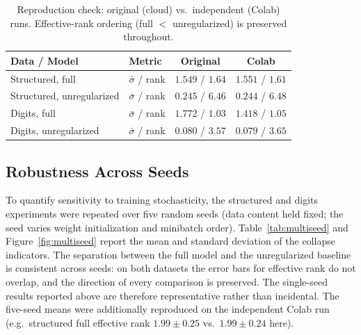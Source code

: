 \begin{table}[htbp]
    \centering
    \caption{Reproduction check: original (cloud) vs.\ independent (Colab)
    runs. Effective-rank ordering (full $<$ unregularized) is preserved
    throughout.}
    \label{tab:repro}
    \begin{tabular}{llcc}
        \toprule
        \textbf{Data / Model} & \textbf{Metric} & \textbf{Original} & \textbf{Colab} \\
        \midrule
        Structured, full          & $\bar\sigma$ / rank & $1.549$ / $1.64$ & $1.551$ / $1.61$ \\
        Structured, unregularized & $\bar\sigma$ / rank & $0.245$ / $6.46$ & $0.244$ / $6.48$ \\
        Digits, full              & $\bar\sigma$ / rank & $1.772$ / $1.03$ & $1.418$ / $1.05$ \\
        Digits, unregularized     & $\bar\sigma$ / rank & $0.080$ / $3.57$ & $0.079$ / $3.65$ \\
        \bottomrule
    \end{tabular}
\end{table}

\subsection{Robustness Across Seeds}
\label{sec:multiseed}
To quantify sensitivity to training stochasticity, the structured and digits
experiments were repeated over five random seeds (data content held fixed;
the seed varies weight initialization and minibatch order).
Table~\ref{tab:multiseed} and Figure~\ref{fig:multiseed} report the mean and
standard deviation of the collapse indicators. The separation between the
full model and the unregularized baseline is consistent across seeds: on both
datasets the error bars for effective rank do not overlap, and the direction
of every comparison is preserved. The single-seed results reported above are
therefore representative rather than incidental. The five-seed means were
additionally reproduced on the independent Colab run (e.g.\ structured full
effective rank $1.99 \pm 0.25$ vs.\ $1.99 \pm 0.24$ here).

